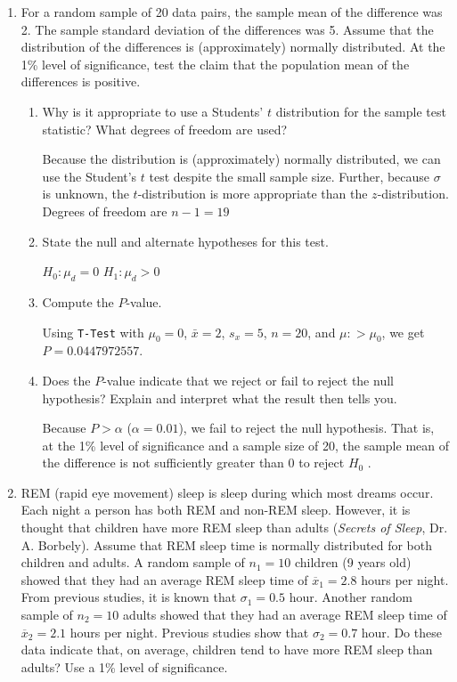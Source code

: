 \begin{enumerate}
\item For a random sample of 20 data pairs, the sample mean of the difference was 2.  The sample standard deviation of the differences was 5.  Assume that the distribution of the differences is (approximately) normally distributed.  At the 1\% level of significance, test the claim that the population mean of the differences is positive.
	\begin{enumerate}
	\item Why is it appropriate to use a Students' $t$ distribution for the sample test statistic?   What degrees of freedom are used? 
	
	{\answer Because the distribution is (approximately) normally distributed, we can use the Student's $t$ test despite the small sample size.  Further, because $\sigma$ is unknown, the $t$-distribution is more appropriate than the $z$-distribution.  
	Degrees of freedom are $n-1 = 19$} 
	 
	
	\item State the null and alternate hypotheses for this test.  
	
	{\answer $H_0 : \mu_d = 0$  
	$H_1: \mu_d > 0$} 
	 
	
	\item Compute the $P$-value.  
	
	{\answer Using \texttt{T-Test} with $\mu_0 = 0$, $\bar{x} = 2$, $s_x = 5$, $n = 20 $, and $\mu: > \mu_0$, we get $P = 0.0447972557$.} 
	 
	
	\item Does the $P$-value indicate that we reject or fail to reject the null hypothesis?  Explain and interpret what the result then tells you.  
	
	{\answer Because $P>\alpha$ ($\alpha= 0.01$), we fail to reject the null hypothesis.  That is, at the 1\% level of significance and a sample size of 20, the sample mean of the difference is not sufficiently greater than $0$ to reject $H_0$ .}
	 
	\end{enumerate}
	

\item REM (rapid eye movement) sleep is sleep during which most dreams occur. Each night a person has both REM and non-REM sleep. However, it is thought that children have more REM sleep than adults ({\it Secrets of Sleep}, Dr. A. Borbely). Assume that REM sleep time is normally distributed for both children and adults. A random sample of $n_1=10$ children (9 years old) showed that they had an average REM sleep time of $\overline{x}_1=2.8$ hours per night. From previous studies, it is known that $\sigma_1=0.5$ hour. Another random sample of $n_2=10$ adults showed that they had an average REM sleep time of $\overline{x}_2=2.1$ hours per night. Previous studies show that $\sigma_2=0.7$ hour. Do these data indicate that, on average, children tend to have more REM sleep than adults? Use a 1\% level of significance.  


\end{enumerate}
